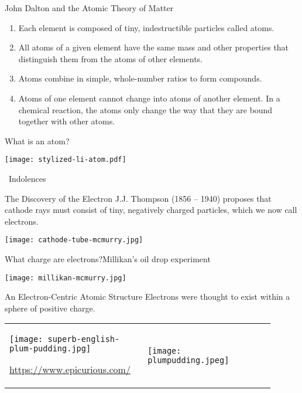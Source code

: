 \documentclass[notes=show]{beamer}
\begin{document}
\begin{frame}{John Dalton and the Atomic Theory of Matter}
	\begin{enumerate}[<+->]
		\item Each element is composed of tiny, indestructible particles
			called atoms.
		\item All atoms of a given element have the same mass and other
			properties that distinguish them from the atoms of other
			elements.
		\item Atoms combine in simple, whole-number ratios to form
			compounds.
		\item Atoms of one element cannot change into atoms of another
			element. In a chemical reaction, the atoms only change
			the way that they are \alert{bound together} with other
			atoms.
	\end{enumerate}
\end{frame}

\begin{frame}{What is an atom?}
	\centering

	\texttt{[image: stylized-li-atom.pdf]}

	\bigskip

	\tiny\ccbysa\ Indolences
\end{frame}

\begin{frame}{The Discovery of the Electron}
	J.J. Thompson (1856 -- 1940) proposes that cathode rays must consist of
	tiny, negatively charged particles, which we now call \alert{electrons}.

	\begin{center}
		\texttt{[image: cathode-tube-mcmurry.jpg]}
	\end{center}
\end{frame}

\begin{frame}{What charge are electrons?}{Millikan's oil drop experiment}
	\begin{center}
		\texttt{[image: millikan-mcmurry.jpg]}
	\end{center}
\end{frame}

\begin{frame}{An Electron-Centric Atomic Structure}
	Electrons were thought to exist within a sphere of
	positive charge.

	\bigskip

	\begin{tabular} {m{0.45\linewidth}@{\qquad}m{0.45\linewidth}}
		\texttt{[image: superb-english-plum-pudding.jpg]}

		\tiny\url{https://www.epicurious.com/}
		& \texttt{[image: plumpudding.jpeg]} \\
	\end{tabular}
\end{frame}
\end{document}
